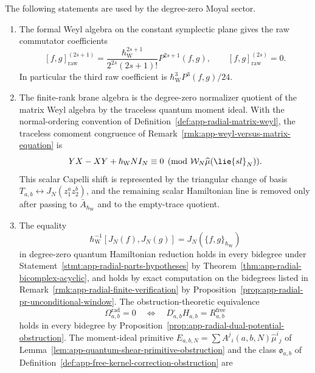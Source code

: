 \begin{prop}
\label{prop:app-moyal-capelli-realization-boundary}
  The following statements are used by the
  degree-zero Moyal sector.
  \begin{enumerate}
    \item The formal Weyl algebra on the constant symplectic plane gives
      the raw commutator coefficients
      \[
        [f,g]_{\mathrm{raw}}^{(2s+1)}
        =
        \frac{\hbar_{\mathrm{W}}^{2s+1}}{2^{2s}(2s+1)!}P^{2s+1}(f,g),
        \qquad
        [f,g]_{\mathrm{raw}}^{(2s)}=0.
      \]
      In particular the third raw coefficient is
      \(\hbar_{\mathrm{W}}^3P^3(f,g)/24\).
    \item The finite-rank brane algebra is the degree-zero normalizer
      quotient of the matrix Weyl algebra by the traceless quantum
      moment ideal.  With the normal-ordering convention of
      Definition~\ref{def:app-radial-matrix-weyl}, the traceless
      comoment congruence of
      Remark~\ref{rmk:app-weyl-versus-matrix-equation} is
      \[
        YX-XY+\hbar_{\mathrm{W}} N I_N\equiv0
        \pmod{\mathcal W_N\widehat\mu(\lie{sl}_N)}.
      \]
      This scalar Capelli shift is represented by the triangular change of
      basis \(T_{a,b}\leftrightarrow J_N(z_1^az_2^b)\), and the remaining
      scalar Hamiltonian line is removed only after passing to
      \(\bar A_{\hbar_{\mathrm{W}}}\) and to the empty-trace quotient.
    \item The equality
      \[
        \hbar_{\mathrm{W}}^{-1}[J_N(f),J_N(g)]
        =
        J_N(\{f,g\}_{\hbar_{\mathrm{W}}})
      \]
      in degree-zero quantum Hamiltonian reduction holds in every
      bidegree under
      Statement~\ref{stmt:app-radial-parts-hypotheses} by
      Theorem~\ref{thm:app-radial-bicomplex-acyclic}, and holds by
      exact computation on the bidegrees listed in
      Remark~\ref{rmk:app-radial-finite-verification} by
      Proposition~\ref{prop:app-radial-pr-unconditional-window}.  The
      obstruction-theoretic equivalence
      \[
        \Omega^{\mathrm{rad}}_{a,b}=0
        \quad\Longleftrightarrow\quad
        D^\square_{a,b}H_{a,b}=R^{\mathrm{free}}_{a,b}
      \]
      holds in every bidegree by
      Proposition~\ref{prop:app-radial-dual-potential-obstruction}.
      The moment-ideal primitive
      \(E_{a,b,N}=\sum A^j{}_i(a,b,N)\widehat\mu^i{}_j\) of
      Lemma~\ref{lem:app-quantum-shear-primitive-obstruction} and the
      class \(\mathfrak o_{a,b}\) of
      Definition~\ref{def:app-free-kernel-correction-obstruction} are

\end{enumerate}
\end{prop}
